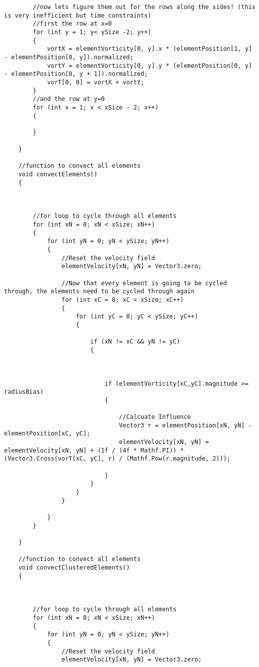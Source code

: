 \begin{mdframed}[linecolor=black, topline=true, bottomline=true,
  leftline=false, rightline=false]
\begin{verbatim}
        //now lets figure them out for the rows along the sides! (this is very inefficient but time constraints)
        //first the row at x=0
        for (int y = 1; y< ySize -2; y++)
        {
            vortX = elementVorticity[0, y].x * (elementPosition[1, y] - elementPosition[0, y]).normalized;
            vortY = elementVorticity[0, y].y * (elementPosition[0, y] - elementPosition[0, y + 1]).normalized;
            vorT[0, 0] = vortX + vortY;
        }
        //and the row at y=0
        for (int x = 1; x < xSize - 2; x++)
        {

        }

    }

    //function to convect all elements
    void convectElements()
    {



        //for loop to cycle through all elements
        for (int xN = 0; xN < xSize; xN++)
        {
            for (int yN = 0; yN < ySize; yN++)
            {
                //Reset the velocity field
                elementVelocity[xN, yN] = Vector3.zero;

                //Now that every element is going to be cycled through, the elements need to be cycled through again
                for (int xC = 0; xC < xSize; xC++)
                {
                    for (int yC = 0; yC < ySize; yC++)
                    {

                        if (xN != xC && yN != yC)
                        {
                 
                            

                            if (elementVorticity[xC,yC].magnitude >= radiusBias)
                            {

                                //Calcuate Influence
                                Vector3 r = elementPosition[xN, yN] - elementPosition[xC, yC];
                                elementVelocity[xN, yN] = elementVelocity[xN, yN] + (1f / (4f * Mathf.PI)) * (Vector3.Cross(vorT[xC, yC], r) / (Mathf.Pow(r.magnitude, 2)));

                            }
                        }
                    }
                }

            }
        }

    }

    //function to convect all elements
    void convectClusteredElements()
    {



        //for loop to cycle through all elements
        for (int xN = 0; xN < xSize; xN++)
        {
            for (int yN = 0; yN < ySize; yN++)
            {
                //Reset the velocity field
                elementVelocity[xN, yN] = Vector3.zero;


\end{verbatim}
\end{mdframed}
